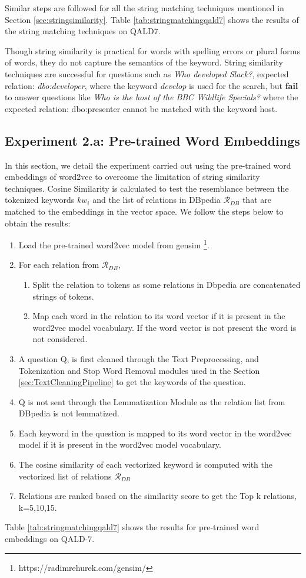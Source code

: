 Similar steps are followed for all the string matching techniques mentioned in Section \ref{sec:stringsimilarity}. Table \ref{tab:stringmatchingqald7} shows the results of the string matching techniques on QALD7.

Though string similarity is practical for words with spelling errors or plural forms of words, they do not capture the semantics of the keyword. String similarity techniques are successful for questions such as \textit{Who developed Slack?}, expected relation: \textit{dbo:developer}, where the keyword \textit{develop} is used for the search,
but \textbf{fail} to answer questions like \textit{Who is the host of the BBC Wildlife Specials?} where the expected relation: dbo:presenter cannot be matched with the keyword host.

\subsection{Experiment 2.a: Pre-trained Word Embeddings}
In this section, we detail the experiment carried out using the pre-trained word embeddings of word2vec to overcome the limitation of string similarity techniques. Cosine Similarity is calculated to test the resemblance between the tokenized keywords $kw_{i}$ and the list of relations in DBpedia $\mathcal{R}_{DB}$ that are matched to the embeddings in the vector space.
We follow the steps below to obtain the results:
\begin{enumerate}
\item Load the pre-trained word2vec model from gensim \footnote{\label{gensim}https://radimrehurek.com/gensim/}.
\item For each relation from $\mathcal{R}_{DB}$,
\begin{enumerate}
    \item Split the relation to tokens as some relations in Dbpedia are concatenated strings of tokens.
    \item Map each word in the relation to its word vector if it is present in the word2vec model vocabulary. If the word vector is not present the word is not considered. 
\end{enumerate}
\item A question Q, is first cleaned through the Text Preprocessing, and Tokenization and Stop Word Removal modules used in the Section \ref{sec:TextCleaningPipeline} to get the keywords of the question.
\item  Q is not sent through the Lemmatization Module as the relation list from DBpedia is not lemmatized.
\item Each keyword in the question is mapped to its word vector in the word2vec model if it is present in the word2vec model vocabulary.
\item The cosine similarity of each vectorized  keyword is computed with the vectorized list of relations $\mathcal{R}_{DB}$
\item Relations are ranked based on the similarity score to get the Top k relations, k=5,10,15.
\end{enumerate}
Table \ref{tab:stringmatchingqald7} shows the results for pre-trained word embeddings on QALD-7.

